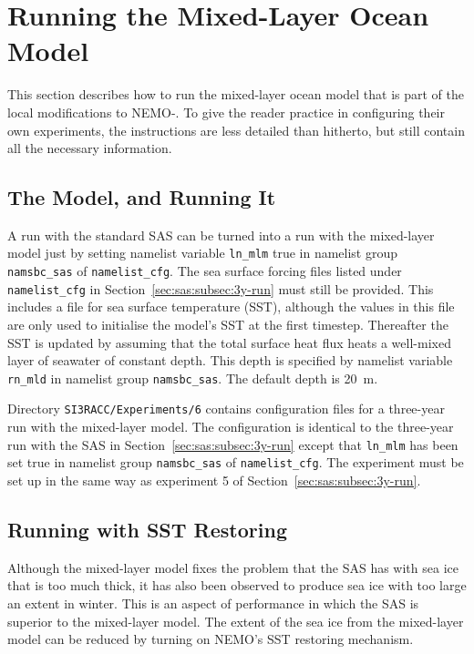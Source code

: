 \section{Running the Mixed-Layer Ocean Model}
\label{sec:mlm}

This section describes how to run the mixed-layer ocean model that is part of the local modifications to NEMO-\SIcu{}.
To give the reader practice in configuring their own experiments, the instructions are less detailed than hitherto, but still contain all the necessary information.


\subsection{The Model, and Running It}
\label{sec:mlm:subsec:running}

A run with the standard SAS can be turned into a run with the mixed-layer model just by setting namelist variable \verb|ln_mlm| true in namelist group \verb|namsbc_sas| of \verb|namelist_cfg|.
The sea surface forcing files listed under \verb|namelist_cfg| in Section~\ref{sec:sas:subsec:3y-run} must still be provided.
This includes a file for sea surface temperature (SST), although the values in this file are only used to initialise the model's SST at the first timestep.
Thereafter the SST is updated by assuming that the total surface heat flux heats a well-mixed layer of seawater of constant depth.
This depth is specified by namelist variable \verb|rn_mld| in namelist group \verb|namsbc_sas|.
The default depth is 20~m.

Directory \verb|SI3RACC/Experiments/6| contains configuration files for a three-year run with the mixed-layer model.
The configuration is identical to the three-year run with the SAS in Section~\ref{sec:sas:subsec:3y-run} except that \verb|ln_mlm| has been set true in namelist group \verb|namsbc_sas| of \verb|namelist_cfg|.
The experiment must be set up in the same way as experiment 5 of Section~\ref{sec:sas:subsec:3y-run}.


\subsection{Running with SST Restoring}
\label{sec:mlm:subsec:sst-restoring}

Although the mixed-layer model fixes the problem that the SAS has with sea ice that is too much thick, it has also been observed to produce sea ice with too large an extent in winter.
This is an aspect of performance in which the SAS is superior to the mixed-layer model.
The extent of the sea ice from the mixed-layer model can be reduced by turning on NEMO's SST restoring mechanism.

